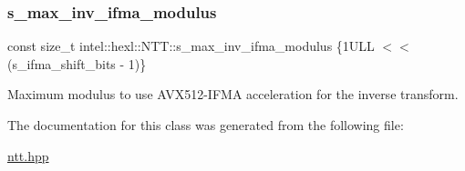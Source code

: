 \subsubsection{\texorpdfstring{s\+\_\+max\+\_\+inv\+\_\+ifma\+\_\+modulus}{s\_max\_inv\_ifma\_modulus}}
{\footnotesize\ttfamily const size\+\_\+t intel\+::hexl\+::\+N\+T\+T\+::s\+\_\+max\+\_\+inv\+\_\+ifma\+\_\+modulus \{1\+U\+L\+L $<$$<$ (s\+\_\+ifma\+\_\+shift\+\_\+bits -\/ 1)\}\hspace{0.3cm}{\ttfamily [static]}}



Maximum modulus to use A\+V\+X512-\/\+I\+F\+MA acceleration for the inverse transform. 



The documentation for this class was generated from the following file\+:\begin{DoxyCompactItemize}
\item 
\hyperlink{ntt_8hpp}{ntt.\+hpp}\end{DoxyCompactItemize}
